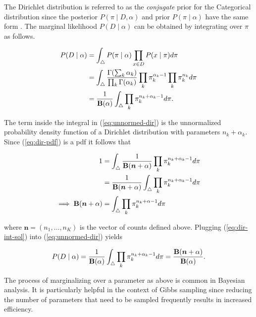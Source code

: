 \documentclass[12pt]{report}
\newcommand{\1}[0]{\mathbbm{1}}
\newcommand{\Bf}[0]{\text{\textbf{B}}}
\begin{document}
The Dirichlet distribution is referred to as the \emph{conjugate} prior for the
Categorical distribution since the posterior $P(\pi \mid D, \alpha)$ and prior $P(\pi \mid \alpha)$
have the same form \cite{gelman-bayesian-data-analysis}. The marginal likelihood $P(D \mid \alpha)$
can be obtained by integrating over $\pi$ as follows.

\begin{align}
    P(D \mid \alpha)
    &= \int_{\triangle} P(\pi \mid \alpha)\prod_{x \in D} P(x \mid \pi) d \pi \nonumber \\
    &= \int_{\triangle} \frac{\Gamma(\sum_k \alpha_k)}{\prod_k \Gamma(\alpha_k)}
                        \prod_k \pi^{\alpha_k - 1}_k \prod_k \pi_k^{n_k} d \pi \nonumber \\
    &= \frac{1}{\Bf(\alpha)}
       \int_{\triangle} \prod_k \pi_k^{n_k + \alpha_k - 1} d \pi. \label{eq:unnormed-dir}
\end{align}

The term inside the integral in (\ref{eq:unnormed-dir}) is the unnormalized probability density function
of a Dirichlet distribution with parameters $n_k + \alpha_k$. Since (\ref{eq:dir-pdf})
is a pdf it follows that

\begin{align}
    1
    &= \int_\triangle \frac{1}{\Bf(\bm{n} + \alpha)} \prod_k \pi_k^{n_k + \alpha_k - 1} d \pi \nonumber \\
    &= \frac{1}{\Bf(\bm{n} + \alpha)} \int_\triangle \prod_k \pi_k^{n_k + \alpha_k - 1} d \pi \nonumber  \\
\implies \Bf(\bm{n} + \alpha) &= \int_\triangle \prod_k \pi_k^{n_k + \alpha - 1} d \pi \label{eq:dir-int-sol}
\end{align}

where $\bm{n} = (n_1, \ldots, n_K)$ is the vector of counts defined above.
Plugging (\ref{eq:dir-int-sol}) into (\ref{eq:unnormed-dir}) yields

\begin{equation}
    P(D \mid \alpha)
    = \frac{1}{\Bf(\alpha)}\int_{\triangle} \prod_k \pi_k^{n_k + \alpha_k - 1} d \pi
    = \frac{\Bf(\bm{n} + \alpha)}{\Bf(\alpha)}. \label{eq:dpcmarg}
\end{equation}

The process of marginalizing over a parameter as above is common in Bayesian analysis.
It is particularly helpful in the context of Gibbs sampling since reducing the number
of parameters that need to be sampled frequently results in increased efficiency.
\end{document}

